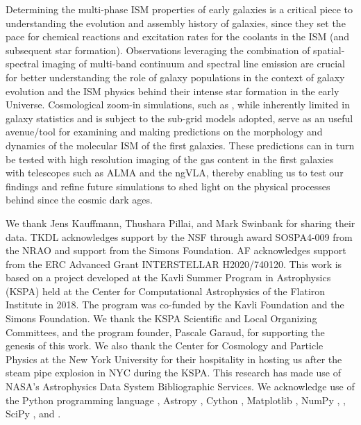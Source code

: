 \IfFileExists{emulateapjlegacy.cls}{\documentclass[iop]{emulateapjlegacy}}{\documentclass[iop]{emulateapj}}
\begin{document}
Determining the multi-phase ISM properties of early galaxies
is a critical piece to understanding the evolution and
assembly history of galaxies, since they set the pace
for chemical reactions and excitation rates for the coolants in the ISM (and subsequent star formation).
Observations leveraging the combination of spatial-spectral imaging of
multi-band continuum and spectral line emission are crucial for better understanding
the role of \highz galaxy populations
in the context of galaxy evolution and the ISM physics behind their intense star formation in the early Universe.
Cosmological zoom-in simulations, such as , while inherently limited in galaxy
statistics and is subject to the sub-grid models adopted, 
serve as an useful avenue/tool for examining and making predictions on the morphology and dynamics of
the molecular ISM of the first galaxies.
These predictions can in turn be
tested with high resolution imaging of the gas content in the first galaxies with telescopes such as ALMA and the ngVLA, thereby 
enabling us to test our findings and refine future simulations to shed light on the physical processes behind 
\SF since the cosmic dark ages.


\acknowledgements

We thank Jens Kauffmann, Thushara Pillai, and Mark Swinbank for sharing their data.
%
TKDL acknowledges support by the NSF through award SOSPA4-009 from the NRAO and support from the Simons Foundation.
%
AF acknowledges support from the ERC Advanced Grant INTERSTELLAR H2020/740120.
%
This work is based on a project developed at the Kavli Summer Program in Astrophysics (KSPA) held at the Center for Computational Astrophysics of the Flatiron Institute in 2018. The program was co-funded by the Kavli Foundation and the Simons Foundation.
%
We thank the KSPA Scientific and Local Organizing Committees, and the program founder, Pascale Garaud, for supporting the genesis of this work.
%
We also thank the Center for Cosmology and Particle Physics at the New York University for their hospitality in hosting us after the steam pipe explosion in NYC during the KSPA.
%
This research has made use of NASA's Astrophysics Data System Bibliographic Services.
%
We acknowledge use of the Python programming language \citep{VanRossum1991}, Astropy \citep{astropy}, Cython \citep{behnel2010cython}, Matplotlib \citep{Hunter2007}, NumPy \citep{VanDerWalt2011},  \citep{Labadens2012}, SciPy \citep{scipyref}, and  \citep{Smith09a,Turk2011a}.
%
\end{document}
